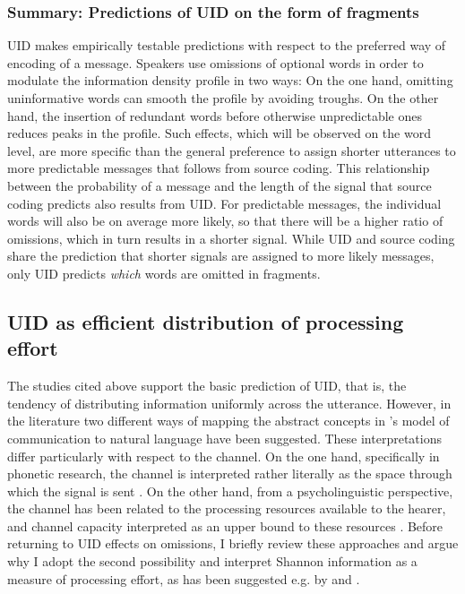 \subsubsection{Summary: Predictions of UID on the form of fragments}
UID makes empirically testable predictions with respect to the preferred way of encoding of a message. Speakers use omissions of optional words in order to modulate the information density profile in two ways: On the one hand, omitting uninformative words can smooth the profile by avoiding troughs. On the other hand, the insertion of redundant words before otherwise unpredictable ones reduces peaks in the profile. Such effects, which will be observed on the word level, are more specific than the general preference to assign shorter utterances to more predictable messages that follows from source coding. This relationship between the probability of a message and the length of the signal that source coding predicts also results from UID. For predictable messages, the individual words will also be on average more likely, so that there will be a higher ratio of omissions, which in turn results in a shorter signal. While UID and source coding share the prediction that shorter signals are assigned to more likely messages, only UID predicts \textit{which} words are omitted in fragments.

\subsection{UID as efficient distribution of processing effort} 
\label{sec:infotheory-effort}
The studies cited above support the basic prediction of UID, that is, the tendency of distributing information uniformly across the utterance. However, in the literature two different ways of mapping the abstract concepts in \citeauthor{shannon1948}'s model of communication to natural language have been suggested. These interpretations differ particularly with respect to the channel. On the one hand, specifically in phonetic research, the channel is interpreted rather literally as the space through which the signal is sent \citep[see e.g.][]{aylett.turk2004}. On the other hand, from a psycholinguistic perspective, the channel has been related to the processing resources available to the hearer, and channel capacity interpreted as an upper bound to these resources \citep[see e.g.][]{fenk.fenk1980}. Before returning to UID effects on omissions, I briefly review these approaches and argue why I adopt the second possibility and interpret Shannon information as a measure of processing effort, as has been suggested e.g. by \citet{hale2001} and \citet{levy2008}. 

